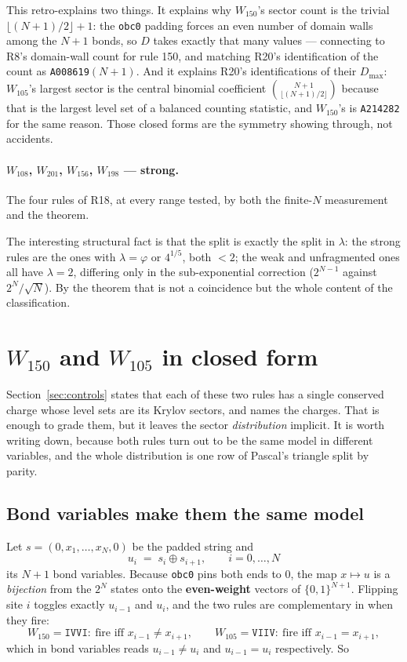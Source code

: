 \documentclass[11pt]{article}
\newcommand{\rt}[1]{\texttt{#1}}
\theoremstyle{plain}
\begin{document}
\noindent This retro-explains two things. It explains why $W_{150}$'s sector
count is the trivial $\lfloor (N+1)/2\rfloor + 1$: the \rt{obc0} padding forces
an even number of domain walls among the $N+1$ bonds, so $D$ takes exactly that
many values --- connecting to R8's domain-wall count for rule 150, and matching
R20's identification of the count as \rt{A008619}$(N+1)$. And it explains R20's identifications of their
$D_{\max}$: $W_{105}$'s largest sector is the central binomial coefficient
$\binom{N+1}{\lfloor (N+1)/2\rfloor}$ because that is the largest level set of a
balanced counting statistic, and $W_{150}$'s is \rt{A214282} for the same
reason. Those closed forms are the symmetry showing through, not accidents.

\paragraph{$W_{108}$, $W_{201}$, $W_{156}$, $W_{198}$ --- strong.} The four
rules of R18, at every range tested, by both the finite-$N$ measurement and the
theorem.

\medskip
\noindent The interesting structural fact is that the split is exactly the split
in $\lambda$: the strong rules are the ones with $\lambda = \varphi$ or
$4^{1/5}$, both $<2$; the weak and unfragmented ones all have
$\lambda = 2$, differing only in the sub-exponential correction
($2^{N-1}$ against $2^N/\sqrt{N}$). By the theorem that is not a coincidence but
the whole content of the classification.

\section{$W_{150}$ and $W_{105}$ in closed form}
\label{sec:distribution}

Section~\ref{sec:controls} states that each of these two rules has a single
conserved charge whose level sets are its Krylov sectors, and names the charges.
That is enough to grade them, but it leaves the sector \emph{distribution}
implicit. It is worth writing down, because both rules turn out to be the same
model in different variables, and the whole distribution is one row of Pascal's
triangle split by parity.

\subsection{Bond variables make them the same model}

Let $s = (0, x_1, \ldots, x_N, 0)$ be the padded string and
\[
u_i \;=\; s_i \oplus s_{i+1}, \qquad i = 0, \ldots, N
\]
its $N+1$ bond variables. Because \rt{obc0} pins both ends to $0$, the map
$x \mapsto u$ is a \emph{bijection} from the $2^N$ states onto the
\textbf{even-weight} vectors of $\{0,1\}^{N+1}$. Flipping site $i$ toggles
exactly $u_{i-1}$ and $u_i$, and the two rules are complementary in when they
fire:
\[
W_{150} = \rt{IVVI}:\ \text{fire iff } x_{i-1} \neq x_{i+1},
\qquad
W_{105} = \rt{VIIV}:\ \text{fire iff } x_{i-1} = x_{i+1},
\]
which in bond variables reads $u_{i-1} \neq u_i$ and $u_{i-1} = u_i$
respectively. So
\end{document}
